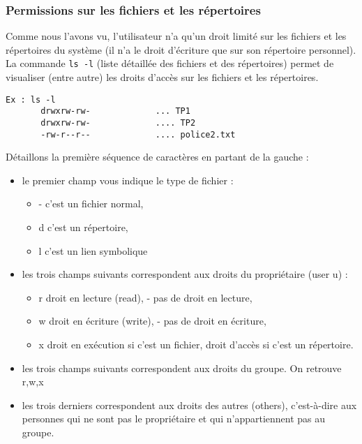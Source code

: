 \documentclass[12pt,a4paper]{article}
\begin{document}
\subsubsection{Permissions sur les fichiers et les répertoires}
    Comme nous l'avons vu, l'utilisateur n'a qu'un droit limité sur
    les fichiers et les répertoires du système (il n'a le droit
    d'écriture que sur son répertoire personnel). La commande {\tt ls -l}
    (liste détaillée des fichiers et des répertoires) permet de
    visualiser (entre autre) les droits d'accès sur les fichiers et
    les répertoires. 

\begin{verbatim}
Ex : ls -l
       drwxrw-rw-             ... TP1
       drwxrw-rw-             .... TP2
       -rw-r--r--             .... police2.txt
\end{verbatim}

Détaillons la première séquence de caractères en partant de la gauche :
\begin{itemize}

\item le premier champ vous indique le type de fichier :
  \begin{itemize}
  \item - c'est un fichier normal,
  \item d c'est un répertoire,
  \item l c'est un lien symbolique
  \end{itemize}

\item les trois champs suivants correspondent aux droits du
  propriétaire (user u) :
  \begin{itemize}
  \item r droit en lecture (read), - pas de droit en lecture,
  \item w droit en écriture (write), - pas de droit en écriture,
  \item x droit en exécution si c'est un fichier, droit d'accès si
    c'est un répertoire.
  \end{itemize}

\item les trois champs suivants correspondent aux droits du groupe. On
  retrouve r,w,x

\item les trois derniers correspondent aux droits des autres (others),
  c'est-à-dire aux personnes qui ne sont pas le propriétaire et qui
  n'appartiennent pas au groupe.  
\end{itemize}
\end{document}
